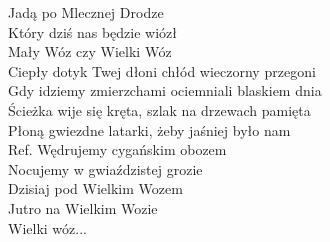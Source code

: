 \begin{flushleft}
\hspace{1.8cm}Jadą po Mlecznej Drodze \\
\hspace{1.8cm}Który dziś nas będzie wiózł \\
\hspace{1.8cm}Mały Wóz czy Wielki Wóz \\
\vskip 3mm
Ciepły dotyk Twej dłoni chłód wieczorny przegoni \\
Gdy idziemy zmierzchami ociemniali blaskiem dnia \\
Ścieżka wije się kręta, szlak na drzewach pamięta \\
Płoną gwiezdne latarki, żeby jaśniej było nam \\
\vskip 3mm
Ref. Wędrujemy cygańskim obozem\\
\hspace{0.9cm}Nocujemy w gwiaździstej grozie \\
\hspace{0.9cm}Dzisiaj pod Wielkim Wozem \\
\hspace{0.9cm}Jutro na Wielkim Wozie \\
\vskip 3mm
\hspace{1.8cm}Wielki wóz...
\end{flushleft}
\clearpage
